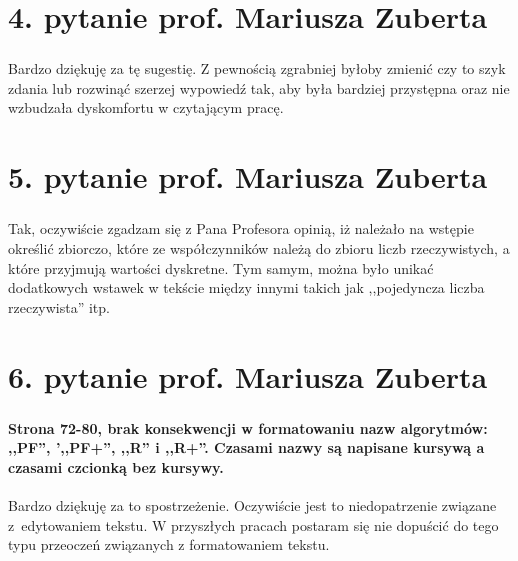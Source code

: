 \section*{4. pytanie prof. Mariusza Zuberta}
\begin{frame}
\frametitle{\secname}
\framesubtitle{\fontsize{4.9}{1}\selectfont{Str. 67 ,,Pomiędzy poszczególnymi robotami występuje zależność osobnika obdarzonego większym respektem w stosunku do pozostałych uczestników ruchu'' – z punktu widzenia matematycznej relacji zapis jest poprawnym jednak z punktu widzenie ,,normalnego czytelnika'' w przyszłości proponuje rozważyć zamianę występujących podmiotów w przytoczonym zdaniu. }}

Bardzo dziękuję za tę sugestię. Z pewnością zgrabniej byłoby zmienić czy to szyk zdania lub rozwinąć szerzej wypowiedź tak, aby była bardziej przystępna oraz nie wzbudzała dyskomfortu w czytającym pracę.
\end{frame}

\section*{5. pytanie prof. Mariusza Zuberta}
\begin{frame}
\frametitle{\secname}
\framesubtitle{\fontsize{4.9}{1}\selectfont{Str. 68 ,,Współczynnik respektu reprezentowany jest przez pojedynczą liczbę rzeczywistą $ k_j $...'' – rozumiem o co chodzi autorowi rozprawy, jednak wydaje mi się bardziej zręczne zaznaczenie na początku pracy, że wszystkie wartości współczynników oraz zmiennych należą do zbioru liczb rzeczywistych i ewentualnie wskazanie zmiennych przyjmujących wartości dyskretne. }}
Tak, oczywiście zgadzam się z Pana Profesora opinią, iż należało na wstępie określić zbiorczo, które ze współczynników należą do zbioru liczb rzeczywistych, a które przyjmują wartości dyskretne. Tym samym, można było unikać dodatkowych wstawek w tekście między innymi takich jak ,,pojedyncza liczba rzeczywista'' itp.
\end{frame}

\section*{6. pytanie prof. Mariusza Zuberta}
\begin{frame}
\frametitle{\secname}
\framesubtitle{Strona 72-80, brak konsekwencji w formatowaniu nazw algorytmów: ,,PF'', ',,PF+'', ,,R'' i ,,R+''. Czasami nazwy są napisane kursywą a czasami czcionką bez kursywy. }
Bardzo dziękuję za to spostrzeżenie. Oczywiście jest to niedopatrzenie związane z~edytowaniem tekstu. W przyszłych pracach postaram się nie dopuścić do tego typu przeoczeń związanych z formatowaniem tekstu.
\end{frame}


